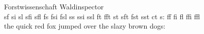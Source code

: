 Forstwissenschaft Waldinspector\\
sf si sl sfi sfl fs fsi fsl ss ssi ssl
ft fft st sft fst sst ct s:
ff fi fl ffi ffl\\
the quick red fox jumped over the slazy brown dogs:
